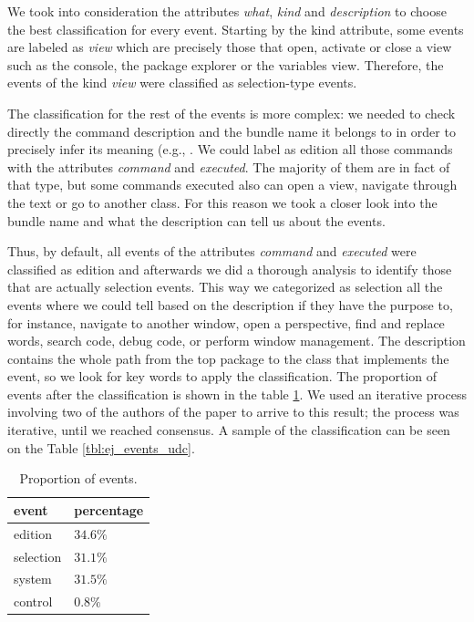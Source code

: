 \documentclass[times]{smrauth}
\begin{document}
We took into consideration the attributes \textit{what}, \textit{kind} and \textit{description} to choose the best classification for every event. Starting by the kind attribute, some events are labeled as \textit{view} which are precisely those that open, activate or close a view such as the console, the package explorer or the variables view. Therefore, the events of the kind \textit{view} were classified as selection-type events.

The classification for the rest of the events is more complex: we needed to check directly the command description and the bundle name it belongs to in order to precisely infer its meaning (e.g., . We could label as edition all those commands with the attributes \textit{command} and \textit{executed}. The majority of them are in fact of that type, but some commands executed also can open a view, navigate through the text or go to another class. For this reason we took a closer look into the bundle name and what the description can tell us about the events.

Thus, by default, all events of the attributes \textit{command} and \textit{executed} were classified as edition and afterwards we did a thorough analysis to identify those that are actually selection events.  This way we categorized as selection all the events where we could tell based on the description if they have the purpose to, for instance, navigate to another window, open a perspective, find and replace words, search code, debug code, or perform window management. The description contains the whole path from the top package to the class that implements the event, so we look for key words to apply the classification. The proportion of events after the classification is shown in the table \ref{tbl:prop_events_udc}.
We used an iterative process involving two of the authors of the paper to arrive to this result; the process was iterative, until we reached consensus. A sample of the classification can be seen on the Table \ref{tbl:ej_events_udc}.

\begin{table}[ht!]
\tiny
\renewcommand{\arraystretch}{1.3}
\caption{Proportion of events. }
\label{tbl:prop_events_udc}
\centering
\begin{tabular}{|p{1.7cm}|p{2 cm}|} 
  \hline 
event & percentage \\  
  \hline 
    \hline 
edition &  $34.6\%$  \\
selection & $31.1\%$ \\
system & $31.5\%$  \\
control & $0.8\%$  \\
\hline
\end{tabular}
\end{table}
\end{document}
